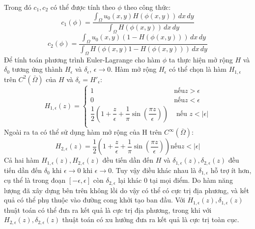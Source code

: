 \documentclass[12pt,oneside,a4]{report}
\begin{document}
Trong đó $c_1, c_2$ có thể được tính theo $\phi$ theo công thức:
\begin{equation}
c_1(\phi)=\dfrac{\int_{\Omega}u_0(x,y)H(\phi(x,y))\,dx \,dy}{\int_{\Omega}H(\phi(x,y))\,dx\,dy}
\end{equation}
\begin{equation}
c_2(\phi)=\dfrac{\int_{\Omega}u_0(x,y)(1-H(\phi(x,y)))\,dx \,dy}{\int_{\Omega}H(\phi(x,y)1-H(\phi(x,y)))\,dx\,dy}
\end{equation}
Để tính toán phương trình Euler-Lagrange cho hàm $\phi$ ta thực hiện mở rộng $H$ và $\delta_0$ tương ứng thành  $H_{\epsilon}$ và $\delta_{\epsilon}$, $\epsilon \rightarrow 0$. Hàm mở rộng $H_{\epsilon}$ có thể chọn là hàm $H_{1,{\epsilon}}$ trên $C^2(\bar{\Omega})$ của $H$ và $\delta_{\epsilon}=H'_{\epsilon}$:
\begin{equation}
 H_{1,\epsilon}(z)=
\begin{cases}
 1 & \text{nếu} z> \epsilon\\
0 & \text{nếu} z <\epsilon \\
\dfrac{1}{2}(1+\dfrac{z}{\epsilon}+\dfrac{1}{\pi}\sin(\dfrac{\pi z}{\epsilon})) & \text{ nếu } z <|\epsilon|\\
   \end{cases}
\end{equation}
Ngoài ra ta có thể sử dụng hàm mở rộng của H trên $C^{\infty}(\bar{\Omega})$:
\begin{equation}
 H_{2,\epsilon}(z)=\dfrac{1}{2}(1+\dfrac{z}{\epsilon}+\dfrac{1}{\pi}\sin(\dfrac{\pi z}{\epsilon}))  \text{nếu} z <|\epsilon|
\end{equation}
Cả hai hàm $ H_{1,\epsilon}(z),  H_{2,\epsilon}(z)$ đều tiến dần đến $H$ và $ \delta_{1,\epsilon}(z),  \delta_{2,\epsilon}(z)$ đều tiến dần đến $\delta_0$ khi $\epsilon\rightarrow 0$ khi $\epsilon\rightarrow 0$. Tuy vậy điều khác nhau là $ \delta_{1,\epsilon}$ hỗ trợ ít hơn, cụ thể là trong đoạn $[-\epsilon, \epsilon]$ còn $ \delta_{2,\epsilon}$ lại khác 0 tại mọi điểm. Do hàm năng lượng đã xây dựng bên trên không lồi do vậy có thể có cực trị địa phương, và kết quả có thể phụ thuộc vào đường cong khởi tạo ban đầu. Với $H_{1,\epsilon}(z), \delta_{1,\epsilon}(z)$ thuật toán có thể đưa ra kết quả là cực trị địa phương, trong khi với $H_{2,\epsilon}(z), \delta_{2,\epsilon}(z)$ thuật toán có xu hướng đưa ra kết quả là cực trị toàn cục.
\end{document}
